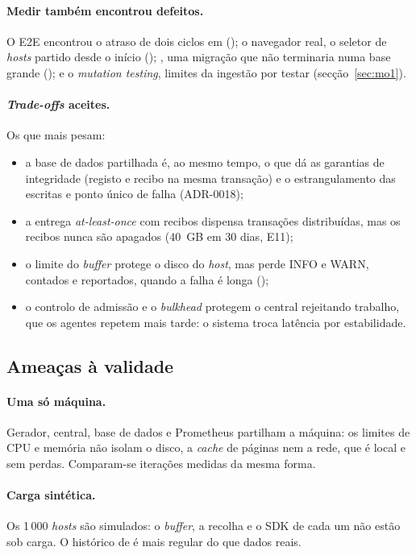 \paragraph{Medir também encontrou defeitos.}
O E2E encontrou o atraso de dois ciclos em  (); o navegador real, o seletor de \emph{hosts}
partido desde o início (); , uma migração que não terminaria numa base grande (); e o
\emph{mutation testing}, limites da ingestão por testar (secção~\ref{sec:mo1}).

\paragraph{\emph{Trade-offs} aceites.}
Os que mais pesam:
\begin{itemize}
\item a base de dados partilhada é, ao mesmo tempo, o que dá as garantias de integridade (registo e recibo na
mesma transação) e o estrangulamento das escritas e ponto único de falha (ADR-0018);
\item a entrega \emph{at-least-once} com recibos dispensa transações distribuídas, mas os recibos nunca são
apagados (40~GB em 30 dias, E11);
\item o limite do \emph{buffer} protege o disco do \emph{host}, mas perde INFO e WARN, contados e reportados, quando
a falha é longa ();
\item o controlo de admissão e o \emph{bulkhead} protegem o central rejeitando trabalho, que os agentes repetem
mais tarde: o sistema troca latência por estabilidade.
\end{itemize}

\subsection{Ameaças à validade}
\label{sec:ameacas}

\paragraph{Uma só máquina.}
Gerador, central, base de dados e Prometheus partilham a máquina: os limites de CPU e memória não isolam o disco,
a \emph{cache} de páginas nem a rede, que é local e sem perdas. Comparam-se iterações medidas da mesma forma.

\paragraph{Carga sintética.}
Os 1\,000 \emph{hosts} são simulados: o \emph{buffer}, a recolha e o SDK de cada um não estão sob carga. O histórico
de  é mais regular do que dados reais.

